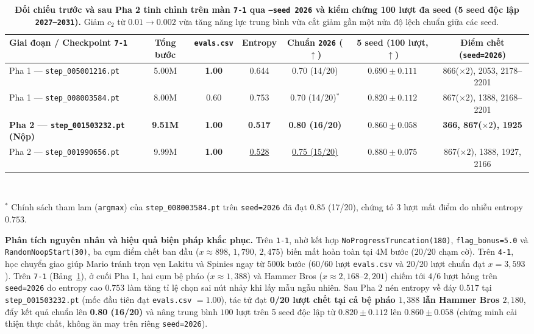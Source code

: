 \documentclass[a4paper,10pt]{article}
\begin{document}
\begin{table}[!htbp]
  \centering
  \caption{\textbf{Đối chiếu trước và sau Pha 2 tinh chỉnh trên màn \texttt{7-1} qua \texttt{--seed 2026} và kiểm chứng 100 lượt đa seed (5 seed độc lập \texttt{2027--2031}).} Giảm $c_2$ từ $0.01 \to 0.002$ vừa tăng năng lực trung bình vừa cắt giảm gần một nửa độ lệch chuẩn giữa các seed.}
  \label{tab:stage2}
  \footnotesize
  \begin{tabular}{@{}lcccccc@{}}
    \toprule
    \textbf{Giai đoạn / Checkpoint \texttt{7-1}} & \textbf{Tổng bước} & \textbf{\texttt{evals.csv}} & \textbf{Entropy} & \textbf{Chuẩn \texttt{2026} ($\uparrow$)} & \textbf{5 seed (100 lượt, $\uparrow$)} & \textbf{Điểm chết (\texttt{seed=2026})} \\
    \midrule
    Pha 1 --- \texttt{step\_005001216.pt} & 5.00M & \textbf{1.00} & 0.644 & 0.70 (14/20) & $0.690 \pm 0.111$ & 866($\times 2$), 2053, 2178--2201 \\
    Pha 1 --- \texttt{step\_008003584.pt} & 8.00M & 0.60 & 0.753 & 0.70 (14/20)$^*$ & $0.820 \pm 0.112$ & 867($\times 2$), 1388, 2168--2201 \\
    \textbf{Pha 2 --- \texttt{step\_001503232.pt} (Nộp)} & \textbf{9.51M} & \textbf{1.00} & \textbf{0.517} & \textbf{0.80 (16/20)} & $\underline{0.860 \pm 0.058}$ & \textbf{366, 867($\times 2$), 1925} \\
    Pha 2 --- \texttt{step\_001990656.pt} & 9.99M & \textbf{1.00} & \underline{0.528} & \underline{0.75 (15/20)} & $\mathbf{0.880 \pm 0.075}$ & 867($\times 2$), 1388, 1927, 2166 \\
    \bottomrule
  \end{tabular}\\[2pt]
  {\scriptsize\raggedright $^*$ Chính sách tham lam (\texttt{argmax}) của \texttt{step\_008003584.pt} trên \texttt{seed=2026} đã đạt $0.85$ (17/20), chứng tỏ 3 lượt mất điểm do nhiễu entropy $0.753$.}
\end{table}

\noindent\textbf{Phân tích nguyên nhân và hiệu quả biện pháp khắc phục.} Trên \texttt{1-1}, nhờ kết hợp \texttt{NoProgressTruncation(180)}, \texttt{flag\_bonus=5.0} và \texttt{RandomNoopStart(30)}, ba cụm điểm chết ban đầu ($x\approx 898$, $1{,}790$, $2{,}475$) biến mất hoàn toàn tại $4\text{M}$ bước ($20/20$ chạm cờ). Trên \texttt{4-1}, học chuyển giao giúp Mario tránh trọn vẹn Lakitu và Spinies ngay từ $500\text{k}$ bước ($60/60$ lượt \texttt{evals.csv} và $20/20$ lượt chuẩn đạt $x=3{,}593$). Trên \texttt{7-1} (Bảng~\ref{tab:stage2}), ở cuối Pha 1, hai cụm bệ pháo ($x\approx 1{,}388$) và Hammer Bros ($x\approx 2{,}168\text{--}2{,}201$) chiếm tới $4/6$ lượt hỏng trên \texttt{seed=2026} do entropy cao $0.753$ làm tăng tỉ lệ chọn sai nút nhảy khi lấy mẫu ngẫu nhiên. Sau Pha 2 nén entropy về đáy $0.517$ tại \texttt{step\_001503232.pt} (mốc đầu tiên đạt \texttt{evals.csv} $= 1.00$), tác tử đạt \textbf{0/20 lượt chết tại cả bệ pháo $1{,}388$ lẫn Hammer Bros $2{,}180$}, đẩy kết quả chuẩn lên \textbf{0.80 (16/20)} và nâng trung bình $100$ lượt trên 5 seed độc lập từ $0.820 \pm 0.112$ lên $\mathbf{0.860 \pm 0.058}$ (chứng minh cải thiện thực chất, không ăn may trên riêng \texttt{seed=2026}).
\end{document}
